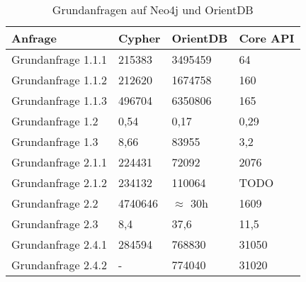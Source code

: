 \FloatBarrier
\begin{table}[h]
	\centering
	\begin{tabular}{ |p{6cm}||p{2cm}|p{2cm}|p{2cm}|  }
		\hline
		Anfrage& Cypher & OrientDB & Core API \\
		\hline
	Grundanfrage 1.1.1  & 215383 & 3495459    &  64\\
	Grundanfrage 1.1.2& 212620 & 1674758   & 160   \\
	Grundanfrage 1.1.3& 496704 & 6350806 & 165  \\
	Grundanfrage 1.2& 0,54 & 0,17   & 0,29   \\
	Grundanfrage 1.3 & 8,66& 83955  & 3,2    \\
	Grundanfrage 2.1.1& 224431 & 72092   & 2076   \\
	Grundanfrage 2.1.2& 234132& 110064  & TODO    \\
	Grundanfrage 2.2& 4740646 &  $\approx$ 30h   & 1609  \\
	Grundanfrage 2.3& 8,4  & 37,6   & 11,5   \\
	Grundanfrage 2.4.1& 284594 & 768830  & 31050\\
	Grundanfrage 2.4.2& -  & 774040   & 31020   \\
		\hline
	\end{tabular}
	\caption{Grundanfragen auf Neo4j und OrientDB}
	\label{tab:Query3}
\end{table}
\FloatBarrier
